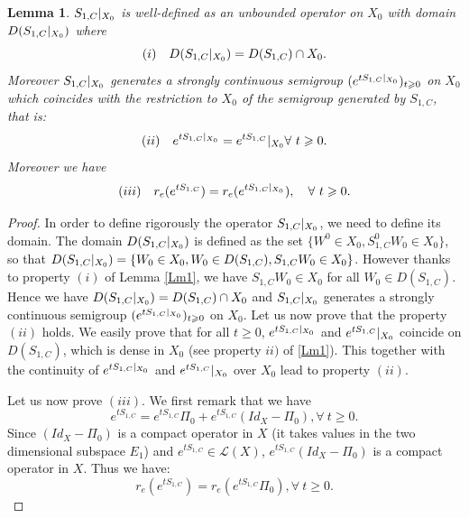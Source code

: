 \documentclass[10pt, english]{article}
\newtheorem{lem}[thm]{Lemma}
\begin{document}
{\begin{lem}
$S_{1,C}\small{|}_{X_0}$ is well-defined as an unbounded operator on $X_0$ with domain $D(S_{1,C}\small{|}_{X_0})$ where 
\begin{equation}\label{C4.43}%
(i) \quad D(S_{1,C}\small{|}_{X_0})=D(S_{1,C})\cap X_0. 
\end{equation}
Moreover $S_{1,C}\small{|}_{X_0}$ generates a strongly continuous semigroup $(e^{tS_{1,C}\small{|}_{X_0}})_{t \geqslant 0}$ on $X_0$ which coincides 
with the restriction to $X_0$ of the semigroup generated by $S_{1,C}$, that is:
$$
(ii) \quad e^{tS_{1,C}\small{|}_{X_0}}=e^{tS_{1,C}}|_{X_0} \forall \ t \geqslant 0.
$$
Moreover we have
\begin{equation}\label{C4.44}%
(iii) \quad r_e(e^{tS_{1,C}})=r_e(e^{tS_{1,C}\small{|}_{X_0}}), \quad \forall \ t \geqslant 0.
\end{equation}
\end{lem}
\begin{proof}
In order to define rigorously the operator $S_{1,C}\small{|}_{X_0}$, we need to define its domain. The domain $D(S_{1,C}\small{|}_{X_0})$ is defined as the set $\{W^0 \in X_0, S_{1,C}^0W_0 \in X_0\}$, so that $D(S_{1,C}\small{|}_{X_0})=\{W_0 \in X_0, W_0 \in D(S_{1,C}), S_{1,C}W_0 \in X_0\}$. However thanks to property $(i)$ of Lemma \ref{Lm1}, we have $S_{1,C}W_0 \in X_0$ for all $W_0 \in D(S_{1,C})$. Hence we have
$D(S_{1,C}\small{|}_{X_0})=D(S_{1,C})\cap X_0$ and $S_{1,C}\small{|}_{X_0}$ generates a strongly continuous semigroup $(e^{tS_{1,C}\small{|}_{X_0}})_{t \geqslant 0}$ on $X_0$. Let us now prove that the property $(ii)$ holds. We easily prove that
for all $t \geqslant 0$, $e^{tS_{1,C}\small{|}_{X_0}}$ and $e^{tS_{1,C}}\small{|}_{X_0}$ coincide on $D(S_{1,C})$, which is dense in $X_0$ (see property $ii)$ of \ref{Lm1}). This together with the continuity of $e^{tS_{1,C}\small{|}_{X_0}}$ and $e^{tS_{1,C}}\small{|}_{X_0}$ over $X_0$ lead to property $(ii)$.

 Let us now prove $(iii)$. We first remark that we have 
 \begin{equation}\label{C4.45}%
 e^{tS_{1,C}}=e^{tS_{1,C}}\Pi_0 + e^{tS_{1,C}}(Id_X - \Pi_0), \forall \ t \geqslant 0.
 \end{equation}
 Since $(Id_X - \Pi_0)$ is a compact operator in $X$ (it takes values in the two dimensional subspace $E_1$) and $e^{tS_{1,C} }\in \mathcal{L}(X)$, $e^{tS_{1,C}}(Id_X - \Pi_0)$ is a compact operator in $X$. Thus we have:
 \begin{equation}\label{C4.46}%
 r_e(e^{tS_{1,C}})=r_e(e^{tS_{1,C}}\Pi_0), \forall \ t \geqslant 0.
 \end{equation}
 

\end{proof}}
\end{document}
